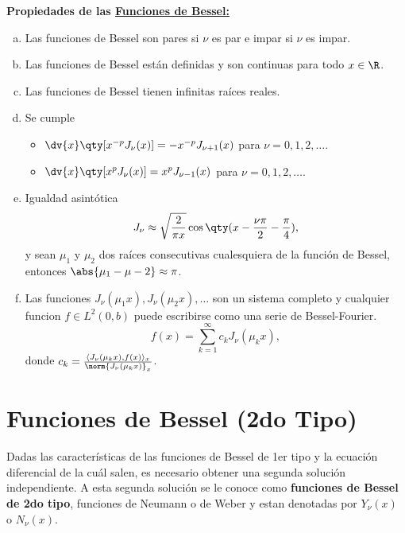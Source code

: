 \begin{mdframed}[style=warning]
	{\Large \textbf{Propiedades de las \href{http://www.sc.ehu.es/sbweb/fisica3/especial/bessel/bessel.html}{Funciones de Bessel:}}} \\
	\begin{enumerate}[a)]
		\item Las funciones de Bessel son pares si $\nu$ es par e impar si $\nu$ es impar.
		\item Las funciones de Bessel están definidas y son continuas para todo $x\in \R$.
		\item Las funciones de Bessel tienen infinitas raíces reales.
		\item Se cumple
		\begin{itemize}
			\item $\dv{x} \qty[x^{-p} J_\nu (x)] = -x^{-p} J_{\nu + 1} (x)$ para $\nu = 0,1,2,\ldots$.
			\item $\dv{x} \qty[x^{p} J_\nu (x)] = x^{p} J_{\nu - 1} (x)$ para $\nu = 0,1,2,\ldots$.
		\end{itemize}
		\item Igualdad asintótica
			$$ J_\nu \approx \sqrt{\frac{2}{\pi x}} \cos{\qty(x - \frac{\nu \pi}{2} - \frac{\pi}{4})}, $$
			y sean $\mu _1$ y $\mu _2$ dos raíces consecutivas cualesquiera de la función de Bessel, entonces $\abs{\mu _1 - \mu -2} \approx \pi$.
		\item Las funciones $J_\nu (\mu _1 x), J_\nu (\mu _2 x), \ldots$ son un sistema completo y cualquier funcion $f\in L^2 (0,b)$ puede escribirse como una serie de Bessel-Fourier.
			$$ f(x) = \sum _{k = 1} ^\infty c_k J_\nu (\mu _k x), $$
		donde $ c_k = \frac{\inner{J_\nu (\mu _k x)}{f(x)}_x}{\norm{J_\nu (\mu _k x)}_x} $.
	\end{enumerate}
\end{mdframed}









\section*{Funciones de Bessel (2do Tipo)}

Dadas las características de las funciones de Bessel de 1er tipo y la ecuación diferencial de la cuál salen, es necesario obtener una segunda solución independiente. A esta segunda solución se le conoce como \textbf{funciones de Bessel de 2do tipo}, funciones de Neumann o de Weber y estan denotadas por $Y_\nu (x)$ o $N_\nu (x)$.


